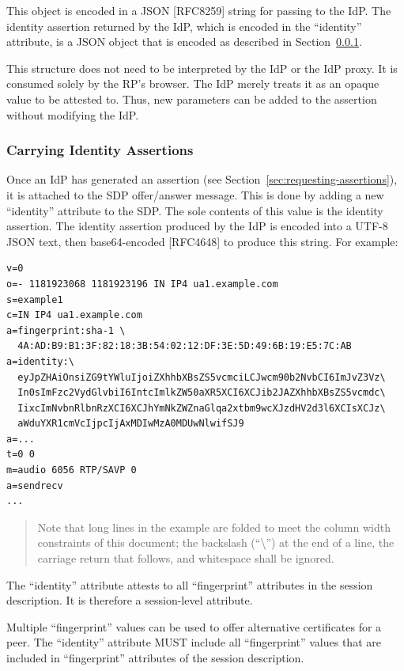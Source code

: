 \documentclass{article}
\begin{document}
This object is encoded in a JSON [RFC8259] string for passing to the
IdP.  The identity assertion returned by the IdP, which is encoded in
the ``identity'' attribute, is a JSON object that is encoded as
described in Section~\ref{sec:carrying-identity}.

This structure does not need to be interpreted by the IdP or the IdP
proxy.  It is consumed solely by the RP's browser.  The IdP merely
treats it as an opaque value to be attested to.  Thus, new parameters
can be added to the assertion without modifying the IdP.

\subsubsection{Carrying Identity Assertions}
\label{sec:carrying-identity}

Once an IdP has generated an assertion (see Section~\ref{sec:requesting-assertions}), it is
attached to the SDP offer/answer message.  This is done by adding a
new ``identity'' attribute to the SDP.  The sole contents of this value
is the identity assertion.  The identity assertion produced by the
IdP is encoded into a UTF-8 JSON text, then base64-encoded [RFC4648]
to produce this string.  For example:

\begin{verbatim}
v=0
o=- 1181923068 1181923196 IN IP4 ua1.example.com
s=example1
c=IN IP4 ua1.example.com
a=fingerprint:sha-1 \
  4A:AD:B9:B1:3F:82:18:3B:54:02:12:DF:3E:5D:49:6B:19:E5:7C:AB
a=identity:\
  eyJpZHAiOnsiZG9tYWluIjoiZXhhbXBsZS5vcmciLCJwcm90b2NvbCI6ImJvZ3Vz\
  In0sImFzc2VydGlvbiI6IntcImlkZW50aXR5XCI6XCJib2JAZXhhbXBsZS5vcmdc\
  IixcImNvbnRlbnRzXCI6XCJhYmNkZWZnaGlqa2xtbm9wcXJzdHV2d3l6XCIsXCJz\
  aWduYXR1cmVcIjpcIjAxMDIwMzA0MDUwNlwifSJ9
a=...
t=0 0
m=audio 6056 RTP/SAVP 0
a=sendrecv
...
\end{verbatim}

\begin{quote}
Note that long lines in the example are folded to meet the
column width constraints of this document; the backslash (``\textbackslash'')
at the end of a line, the carriage return that follows, and
whitespace shall be ignored.
\end{quote}

The ``identity'' attribute attests to all ``fingerprint'' attributes in
the session description.  It is therefore a session-level attribute.

Multiple ``fingerprint'' values can be used to offer alternative
certificates for a peer.  The ``identity'' attribute MUST include all
``fingerprint'' values that are included in ``fingerprint'' attributes of
the session description.
\end{document}
